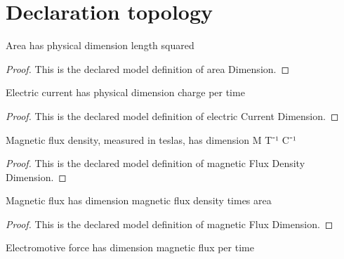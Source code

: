 \section{Declaration topology}
\begin{definition}
  \label{def:physics:phyx-mini-0980:phyxminiproblems-problemphyxmini0980-areadimension}
  Area has physical dimension length squared
\end{definition}
\begin{proof}
  This is the declared model definition of area Dimension.
\end{proof}
\begin{definition}
  \label{def:physics:phyx-mini-0980:phyxminiproblems-problemphyxmini0980-electriccurrentdimension}
  Electric current has physical dimension charge per time
\end{definition}
\begin{proof}
  This is the declared model definition of electric Current Dimension.
\end{proof}
\begin{definition}
  \label{def:physics:phyx-mini-0980:phyxminiproblems-problemphyxmini0980-magneticfluxdensitydimension}
  Magnetic flux density, measured in teslas, has dimension M T⁻¹ C⁻¹
\end{definition}
\begin{proof}
  This is the declared model definition of magnetic Flux Density Dimension.
\end{proof}
\begin{definition}
  \label{def:physics:phyx-mini-0980:phyxminiproblems-problemphyxmini0980-magneticfluxdimension}
  Magnetic flux has dimension magnetic flux density times area
\end{definition}
\begin{proof}
  This is the declared model definition of magnetic Flux Dimension.
\end{proof}
\begin{definition}
  \label{def:physics:phyx-mini-0980:phyxminiproblems-problemphyxmini0980-electromotiveforcedimension}
  Electromotive force has dimension magnetic flux per time
\end{definition}
